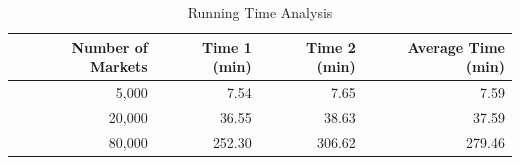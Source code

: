 \begin{table}
\caption{Running Time Analysis}
\label{tab:runtime}
\begin{tabular}{rrrr}
\toprule
Number of Markets & Time 1 (min) & Time 2 (min) & Average Time (min) \\
\midrule
5,000 & 7.54 & 7.65 & 7.59 \\
20,000 & 36.55 & 38.63 & 37.59 \\
80,000 & 252.30 & 306.62 & 279.46 \\
\bottomrule
\end{tabular}
\end{table}
